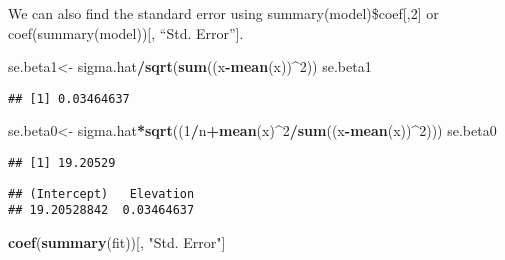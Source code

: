 \documentclass[
]{article}
\newenvironment{Shaded}{\begin{snugshade}}{\end{snugshade}}
\newcommand{\DecValTok}[1]{\textcolor[rgb]{0.00,0.00,0.81}{#1}}
\newcommand{\FunctionTok}[1]{\textcolor[rgb]{0.13,0.29,0.53}{\textbf{#1}}}
\newcommand{\NormalTok}[1]{#1}
\newcommand{\OtherTok}[1]{\textcolor[rgb]{0.56,0.35,0.01}{#1}}
\newcommand{\SpecialCharTok}[1]{\textcolor[rgb]{0.81,0.36,0.00}{\textbf{#1}}}
\newcommand{\StringTok}[1]{\textcolor[rgb]{0.31,0.60,0.02}{#1}}
\begin{document}
We can also find the standard error using summary(model)\$coef{[},2{]}
or coef(summary(model)){[}, ``Std. Error''{]}.

\begin{Shaded}
\begin{Highlighting}[]
\NormalTok{se.beta1}\OtherTok{\textless{}{-}}\NormalTok{ sigma.hat}\SpecialCharTok{/}\FunctionTok{sqrt}\NormalTok{(}\FunctionTok{sum}\NormalTok{((x}\SpecialCharTok{{-}}\FunctionTok{mean}\NormalTok{(x))}\SpecialCharTok{\^{}}\DecValTok{2}\NormalTok{))}
\NormalTok{se.beta1}
\end{Highlighting}
\end{Shaded}

\begin{verbatim}
## [1] 0.03464637
\end{verbatim}

\begin{Shaded}
\begin{Highlighting}[]
\NormalTok{se.beta0}\OtherTok{\textless{}{-}}\NormalTok{ sigma.hat}\SpecialCharTok{*}\FunctionTok{sqrt}\NormalTok{((}\DecValTok{1}\SpecialCharTok{/}\NormalTok{n}\SpecialCharTok{+}\FunctionTok{mean}\NormalTok{(x)}\SpecialCharTok{\^{}}\DecValTok{2}\SpecialCharTok{/}\FunctionTok{sum}\NormalTok{((x}\SpecialCharTok{{-}}\FunctionTok{mean}\NormalTok{(x))}\SpecialCharTok{\^{}}\DecValTok{2}\NormalTok{)))}
\NormalTok{se.beta0}
\end{Highlighting}
\end{Shaded}

\begin{verbatim}
## [1] 19.20529
\end{verbatim}

\begin{Shaded}
\end{Shaded}

\begin{verbatim}
## (Intercept)   Elevation 
## 19.20528842  0.03464637
\end{verbatim}

\begin{Shaded}
\begin{Highlighting}[]
\FunctionTok{coef}\NormalTok{(}\FunctionTok{summary}\NormalTok{(fit))[, }\StringTok{"Std. Error"}\NormalTok{]}
\end{Highlighting}
\end{Shaded}
\end{document}
